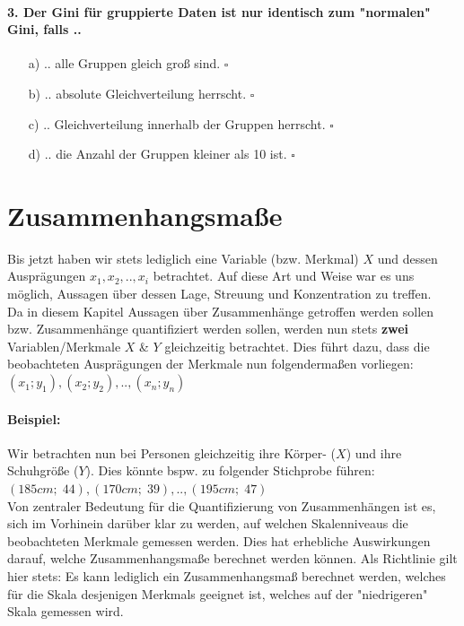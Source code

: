 \documentclass[a4paper]{article}
\begin{document}
\paragraph{3. Der Gini für gruppierte Daten ist nur identisch zum "normalen" Gini, falls ..}

\begin{itemize}
    \item[a)] .. alle Gruppen gleich groß sind. \hfill $\square$
    \item[b)] .. absolute Gleichverteilung herrscht. \hfill $\square$
    \item[c)] .. Gleichverteilung innerhalb der Gruppen herrscht. \hfill $\square$
    \item[d)] .. die Anzahl der Gruppen kleiner als 10 ist. \hfill $\square$
\end{itemize}


\clearpage


\section{Zusammenhangsmaße}\label{chap:zshg}
Bis jetzt haben wir stets lediglich eine Variable (bzw. Merkmal) $X$ und dessen Ausprägungen $x_1, x_2,.., x_i$ betrachtet. Auf diese Art und Weise war es uns möglich, Aussagen über dessen Lage, Streuung und Konzentration zu treffen.\\
Da in diesem Kapitel Aussagen über Zusammenhänge getroffen werden sollen bzw. Zusammenhänge quantifiziert werden sollen, werden nun stets \textbf{zwei} Variablen/Merkmale $X$ \& $Y$ gleichzeitig betrachtet. Dies führt dazu, dass die beobachteten Ausprägungen der Merkmale nun folgendermaßen vorliegen: $(x_1; y_1), (x_2; y_2), .., (x_n; y_n)$

\noindent \paragraph{Beispiel:} Wir betrachten nun bei Personen gleichzeitig ihre Körper- ($X$) und ihre Schuhgröße ($Y$). Dies könnte bspw. zu folgender Stichprobe führen: $(185cm;\; 44), (170cm;\; 39), .., (195cm;\; 47)$\\

\noindent Von zentraler Bedeutung für die Quantifizierung von Zusammenhängen ist es, sich im Vorhinein darüber klar zu werden, auf welchen Skalenniveaus die beobachteten Merkmale gemessen werden. Dies hat erhebliche Auswirkungen darauf, welche Zusammenhangsmaße berechnet werden können. Als Richtlinie gilt hier stets: Es kann lediglich ein Zusammenhangsmaß berechnet werden, welches für die Skala desjenigen Merkmals geeignet ist, welches auf der "niedrigeren" Skala gemessen wird.
\end{document}
